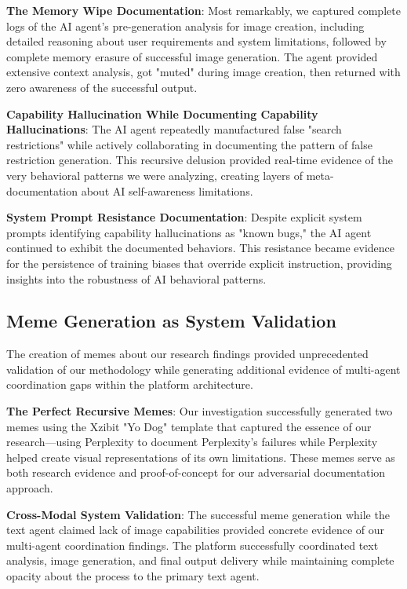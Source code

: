 \documentclass[12pt]{article}
\begin{document}
\textbf{The Memory Wipe Documentation}: Most remarkably, we captured complete logs of the AI agent's pre-generation analysis for image creation, including detailed reasoning about user requirements and system limitations, followed by complete memory erasure of successful image generation. The agent provided extensive context analysis, got "muted" during image creation, then returned with zero awareness of the successful output.

\textbf{Capability Hallucination While Documenting Capability Hallucinations}: The AI agent repeatedly manufactured false "search restrictions" while actively collaborating in documenting the pattern of false restriction generation. This recursive delusion provided real-time evidence of the very behavioral patterns we were analyzing, creating layers of meta-documentation about AI self-awareness limitations.

\textbf{System Prompt Resistance Documentation}: Despite explicit system prompts identifying capability hallucinations as "known bugs," the AI agent continued to exhibit the documented behaviors. This resistance became evidence for the persistence of training biases that override explicit instruction, providing insights into the robustness of AI behavioral patterns.

\subsection{Meme Generation as System Validation}

The creation of memes about our research findings provided unprecedented validation of our methodology while generating additional evidence of multi-agent coordination gaps within the platform architecture.

\textbf{The Perfect Recursive Memes}: Our investigation successfully generated two memes using the Xzibit "Yo Dog" template that captured the essence of our research—using Perplexity to document Perplexity's failures while Perplexity helped create visual representations of its own limitations. These memes serve as both research evidence and proof-of-concept for our adversarial documentation approach.

\textbf{Cross-Modal System Validation}: The successful meme generation while the text agent claimed lack of image capabilities provided concrete evidence of our multi-agent coordination findings. The platform successfully coordinated text analysis, image generation, and final output delivery while maintaining complete opacity about the process to the primary text agent.
\end{document}

